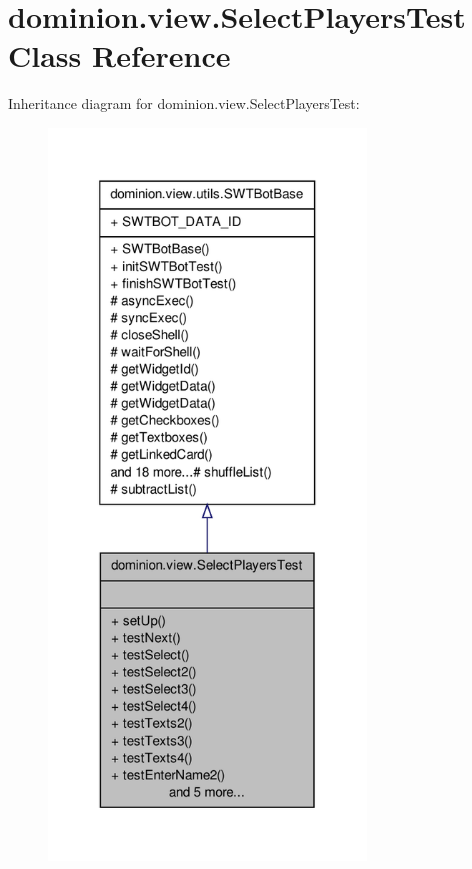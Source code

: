 \hypertarget{classdominion_1_1view_1_1SelectPlayersTest}{\section{dominion.\-view.\-Select\-Players\-Test \-Class \-Reference}
\label{classdominion_1_1view_1_1SelectPlayersTest}
}


\-Inheritance diagram for dominion.\-view.\-Select\-Players\-Test\-:
\nopagebreak
\begin{figure}[H]
\begin{center}
\leavevmode
\includegraphics[height=550pt]{classdominion_1_1view_1_1SelectPlayersTest__inherit__graph}
\end{center}
\end{figure}


